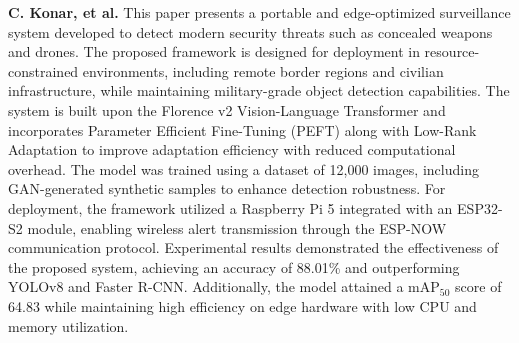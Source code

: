 \textbf{C. Konar, et al.} This paper presents a portable and edge-optimized surveillance system developed to detect modern security threats such as concealed weapons and drones. The proposed framework is designed for deployment in resource-constrained environments, including remote border regions and civilian infrastructure, while maintaining military-grade object detection capabilities. The system is built upon the Florence v2 Vision-Language Transformer and incorporates Parameter Efficient Fine-Tuning (PEFT) along with Low-Rank Adaptation to improve adaptation efficiency with reduced computational overhead. The model was trained using a dataset of 12,000 images, including GAN-generated synthetic samples to enhance detection robustness. For deployment, the framework utilized a Raspberry Pi 5 integrated with an ESP32-S2 module, enabling wireless alert transmission through the ESP-NOW communication protocol. Experimental results demonstrated the effectiveness of the proposed system, achieving an accuracy of 88.01\% and outperforming YOLOv8 and Faster R-CNN. Additionally, the model attained a mAP$_{50}$ score of 64.83 while maintaining high efficiency on edge hardware with low CPU and memory utilization.
\cite{supplementary_paper_10}

